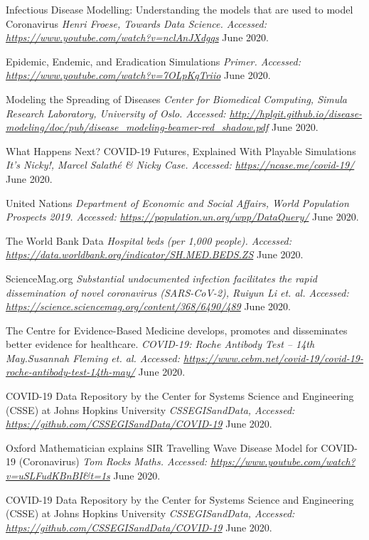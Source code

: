 \begin{thebibliography}{1}
 Infectious Disease Modelling: Understanding the models that are used to model Coronavirus {\em Henri Froese, Towards Data Science. Accessed:  \url{https://www.youtube.com/watch?v=nclAnJXdgqs}} June 2020.

 Epidemic, Endemic, and Eradication Simulations {\em Primer. Accessed:  \url{https://www.youtube.com/watch?v=7OLpKqTriio}} June 2020.

 Modeling the Spreading of Diseases {\em Center for Biomedical Computing, Simula Research Laboratory, University of Oslo. Accessed:  \url{http://hplgit.github.io/disease-modeling/doc/pub/disease_modeling-beamer-red_shadow.pdf}} June 2020.

 What Happens Next? COVID-19 Futures, Explained With Playable Simulations {\em It's Nicky!, Marcel Salathé & Nicky Case. Accessed:  \url{https://ncase.me/covid-19/}} June 2020.

 United Nations {\em Department of Economic and Social Affairs, World Population Prospects 2019. Accessed:  \url{https://population.un.org/wpp/DataQuery/}} June 2020.

 The World Bank Data {\em Hospital beds (per 1,000 people). Accessed:  \url{https://data.worldbank.org/indicator/SH.MED.BEDS.ZS}} June 2020.

 ScienceMag.org {\em Substantial undocumented infection facilitates the rapid dissemination of novel coronavirus (SARS-CoV-2), Ruiyun Li et. al. Accessed:  \url{https://science.sciencemag.org/content/368/6490/489}} June 2020.

 The Centre for Evidence-Based Medicine develops, promotes and disseminates better evidence for healthcare. {\em COVID-19: Roche Antibody Test – 14th May.Susannah Fleming et. al. Accessed:  \url{https://www.cebm.net/covid-19/covid-19-roche-antibody-test-14th-may/}} June 2020.

 COVID-19 Data Repository by the Center for Systems Science and Engineering (CSSE) at Johns Hopkins University {\em CSSEGISandData, Accessed:  \url{https://github.com/CSSEGISandData/COVID-19}} June 2020.

 Oxford Mathematician explains SIR Travelling Wave Disease Model for COVID-19 (Coronavirus) {\em Tom Rocks Maths. Accessed:  \url{https://www.youtube.com/watch?v=uSLFudKBnBI&t=1s}} June 2020.

 COVID-19 Data Repository by the Center for Systems Science and Engineering (CSSE) at Johns Hopkins University {\em CSSEGISandData, Accessed:  \url{https://github.com/CSSEGISandData/COVID-19}} June 2020.


\end{thebibliography}
